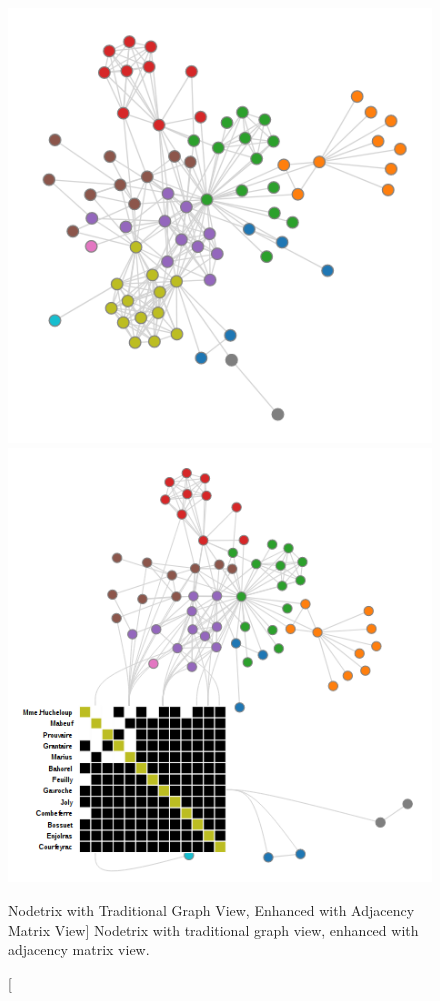 \begin{figure}[h]
\centering
\includegraphics[width=\textwidth/3]{images/nodetrix_matrix}
\includegraphics[width=\textwidth/3]{images/nodetrix_cluster}
\caption
  [Nodetrix with Traditional Graph View, Enhanced with Adjacency Matrix View]
  {Nodetrix with traditional graph view, enhanced with adjacency matrix view.}
  \label{fig:nodetrix_cluster}
\end{figure}



